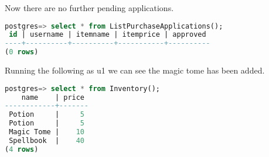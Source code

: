 Now there are no further pending applications.

\begin{lstlisting}[language=SQL]
postgres=> select * from ListPurchaseApplications();
 id | username | itemname | itemprice | approved 
----+----------+----------+-----------+----------
(0 rows)
\end{lstlisting}

Running the following as u1 we can see the magic tome has been added.

\begin{lstlisting}[language=SQL]
postgres=> select * from Inventory();
    name    | price 
------------+-------
 Potion     |     5
 Potion     |     5
 Magic Tome |    10
 Spellbook  |    40
(4 rows)
\end{lstlisting}


